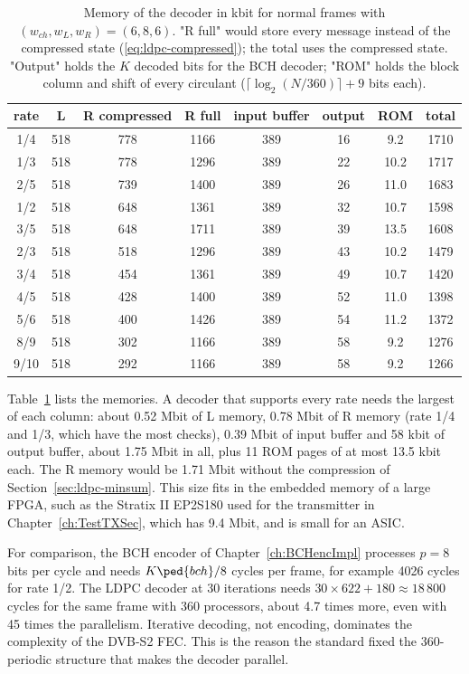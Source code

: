 \begin{table} \centering
\begin{tabular}{|c|c|c|c|c|c|c|c|}
\hline
rate & L & R compressed & R full & input buffer & output & ROM & total \\
\hline
1/4 & 518 & 778 & 1166 & 389 & 16 & 9.2 & 1710 \\
1/3 & 518 & 778 & 1296 & 389 & 22 & 10.2 & 1717 \\
2/5 & 518 & 739 & 1400 & 389 & 26 & 11.0 & 1683 \\
1/2 & 518 & 648 & 1361 & 389 & 32 & 10.7 & 1598 \\
3/5 & 518 & 648 & 1711 & 389 & 39 & 13.5 & 1608 \\
2/3 & 518 & 518 & 1296 & 389 & 43 & 10.2 & 1479 \\
3/4 & 518 & 454 & 1361 & 389 & 49 & 10.7 & 1420 \\
4/5 & 518 & 428 & 1400 & 389 & 52 & 11.0 & 1398 \\
5/6 & 518 & 400 & 1426 & 389 & 54 & 11.2 & 1372 \\
8/9 & 518 & 302 & 1166 & 389 & 58 & 9.2 & 1276 \\
9/10 & 518 & 292 & 1166 & 389 & 58 & 9.2 & 1266 \\
\hline
\end{tabular}
\caption{Memory of the decoder in kbit for normal frames with \((w_{ch}, w_L, w_R) = (6, 8, 6)\). "R full" would store every message instead of the compressed state (\ref{eq:ldpc-compressed}); the total uses the compressed state. "Output" holds the \(K\) decoded bits for the BCH decoder; "ROM" holds the block column and shift of every circulant (\(\lceil\log_2(N/360)\rceil + 9\) bits each).} \label{tb:ldpc-memory}
\end{table}

Table~\ref{tb:ldpc-memory} lists the memories. A decoder that supports every rate needs the largest of each column: about 0.52 Mbit of L memory, 0.78 Mbit of R memory (rate 1/4 and 1/3, which have the most checks), 0.39 Mbit of input buffer and 58 kbit of output buffer, about 1.75 Mbit in all, plus 11 ROM pages of at most 13.5 kbit each. The R memory would be 1.71 Mbit without the compression of Section~\ref{sec:ldpc-minsum}. This size fits in the embedded memory of a large FPGA, such as the Stratix II EP2S180 used for the transmitter in Chapter~\ref{ch:TestTXSec}, which has 9.4 Mbit, and is small for an ASIC.

For comparison, the BCH encoder of Chapter~\ref{ch:BCHencImpl} processes \(p = 8\) bits per cycle and needs \(K\ped{bch}/8\) cycles per frame, for example 4026 cycles for rate 1/2. The LDPC decoder at 30 iterations needs \(30 \times 622 + 180 \approx 18\,800\) cycles for the same frame with 360 processors, about 4.7 times more, even with 45 times the parallelism. Iterative decoding, not encoding, dominates the complexity of the DVB-S2 FEC. This is the reason the standard fixed the 360-periodic structure that makes the decoder parallel.

